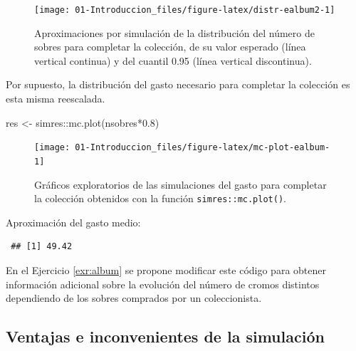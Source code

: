 \documentclass[
]{book}
\newenvironment{Shaded}{\begin{snugshade}}{\end{snugshade}}
\newcommand{\CommentTok}[1]{\textcolor[rgb]{0.56,0.35,0.01}{\textit{#1}}}
\newcommand{\FloatTok}[1]{\textcolor[rgb]{0.00,0.00,0.81}{#1}}
\newcommand{\FunctionTok}[1]{\textcolor[rgb]{0.00,0.00,0.00}{#1}}
\newcommand{\NormalTok}[1]{#1}
\newcommand{\OtherTok}[1]{\textcolor[rgb]{0.56,0.35,0.01}{#1}}
\newcommand{\SpecialCharTok}[1]{\textcolor[rgb]{0.00,0.00,0.00}{#1}}
\theoremstyle{break}
\theoremstyle{nonumberplain}
\renewcommand{\CommentTok}[1]{\textcolor[rgb]{0.41,0.41,0.41}{\texttt{#1}}}
\begin{document}
\begin{figure}[!htb]

{\centering \texttt{[image: 01-Introduccion\_files/figure-latex/distr-ealbum2-1]} 

}

\caption{Aproximaciones por simulación de la distribución del número de sobres para completar la colección, de su valor esperado (línea vertical continua) y del cuantil 0.95 (línea vertical discontinua).}\label{fig:distr-ealbum2}
\end{figure}

Por supuesto, la distribución del gasto necesario para completar la colección es esta misma reescalada.



\begin{Shaded}
\begin{Highlighting}[]
\NormalTok{res }\OtherTok{\textless{}{-}}\NormalTok{ simres}\SpecialCharTok{::}\FunctionTok{mc.plot}\NormalTok{(nsobres}\SpecialCharTok{*}\FloatTok{0.8}\NormalTok{)}
\end{Highlighting}
\end{Shaded}

\begin{figure}[!htb]

{\centering \texttt{[image: 01-Introduccion\_files/figure-latex/mc-plot-ealbum-1]} 

}

\caption{Gráficos exploratorios de las simulaciones del gasto para completar la colección obtenidos con la función \texttt{simres::mc.plot()}.}\label{fig:mc-plot-ealbum}
\end{figure}

Aproximación del gasto medio:

\begin{Shaded}
\end{Shaded}

\begin{verbatim}
 ## [1] 49.42
\end{verbatim}

En el Ejercicio \ref{exr:album} se propone modificar este código para obtener información adicional sobre la evolución del número de cromos distintos dependiendo de los sobres comprados por un coleccionista.

\hypertarget{ventajas-e-inconvenientes-de-la-simulaciuxf3n}{%
\subsection{Ventajas e inconvenientes de la simulación}\label{ventajas-e-inconvenientes-de-la-simulaciuxf3n}}
\end{document}

